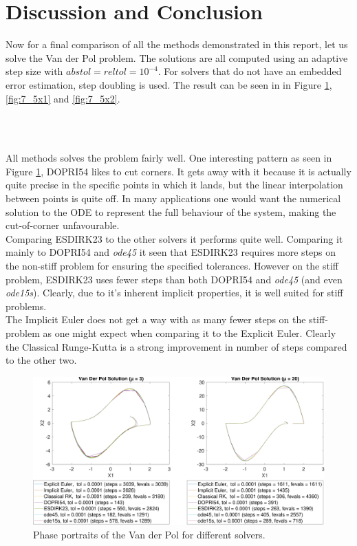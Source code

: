 \section{Discussion and Conclusion}
Now for a final comparison of all the methods demonstrated in this report, let us solve the Van der Pol problem. The solutions are all computed using an adaptive step size with $abstol = reltol = 10^{-4}$. For solvers that do not have an embedded error estimation, step doubling is used. The result can be seen in in Figure \ref{fig:7_5pp}, \ref{fig:7_5x1} and \ref{fig:7_5x2}.

\\\

All methods solves the problem fairly well. One interesting pattern as seen in Figure \ref{fig:7_5pp}, DOPRI54 likes to cut corners. It gets away with it because it is actually quite precise in the specific points in which it lands, but the linear interpolation between points is quite off. In many applications one would want the numerical solution to the ODE to represent the full behaviour of the system, making the cut-of-corner unfavourable.\\

Comparing ESDIRK23 to the other solvers it performs quite well. Comparing it mainly to DOPRI54 and \textit{ode45} it seen that ESDIRK23 requires more steps on the non-stiff problem for ensuring the specified tolerances. However on the stiff problem, ESDIRK23 uses fewer steps than both DOPRI54 and \textit{ode45} (and even \textit{ode15s}). Clearly, due to it's inherent implicit properties, it is well suited for stiff problems.\\
The Implicit Euler does not get a way with as many fewer steps on the stiff-problem as one might expect when comparing it to the Explicit Euler. Clearly the Classical Runge-Kutta is a strong improvement in number of steps compared to the other two.


\begin{figure}[H]
    \centering
    \includegraphics[width=\textwidth]{plots/7_5b.pdf}
    \caption{Phase portraits of the Van der Pol for different solvers.}
    \label{fig:7_5pp}
\end{figure}

